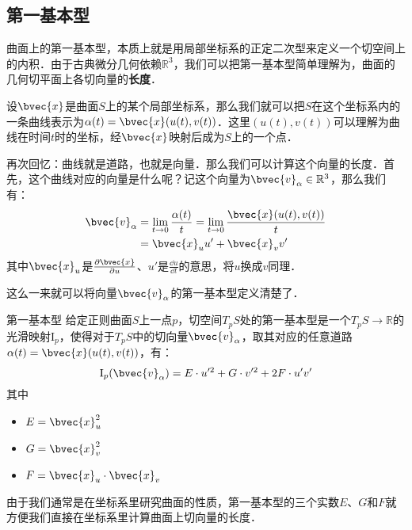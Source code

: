 
\subsection{第一基本型}

曲面上的第一基本型，本质上就是用局部坐标系的正定二次型来定义一个切空间上的内积．由于古典微分几何依赖$\mathbb{R}^3$，我们可以把第一基本型简单理解为，曲面的几何切平面上各切向量的\textbf{长度}．

设$\bvec{x}$是曲面$S$上的某个局部坐标系，那么我们就可以把$S$在这个坐标系内的一条曲线表示为$\alpha(t)=\bvec{x}(u(t), v(t))$．这里$(u(t), v(t))$可以理解为曲线在时间$t$时的坐标，经$\bvec{x}$映射后成为$S$上的一个点．

再次回忆：曲线就是道路，也就是向量．那么我们可以计算这个向量的长度．首先，这个曲线对应的向量是什么呢？记这个向量为$\bvec{v}_\alpha\in\mathbb{R}^3$，那么我们有：
\begin{equation}
\begin{aligned}
\bvec{v}_\alpha&=\lim\limits_{t\to 0}\frac{\alpha(t)}{t}=\lim\limits_{t\to 0}\frac{\bvec{x}(u(t), v(t))}{t}\\
&=\bvec{x}_uu'+\bvec{x}_vv'
\end{aligned}
\end{equation}
其中$\bvec{x}_u$是$\frac{\partial\bvec{x}}{\partial u}$、$u'$是$\frac{\dd u}{\dd t}$的意思，将$u$换成$v$同理．

这么一来就可以将向量$\bvec{v}_\alpha$的第一基本型定义清楚了．

\begin{definition}{第一基本型}\label{FForm_def1}
给定正则曲面$S$上一点$p$，切空间$T_pS$处的第一基本型是一个$T_pS\to \mathbb{R}$的光滑映射$\mathrm{I}_p$，使得对于$T_pS$中的切向量$\bvec{v}_\alpha$，取其对应的任意道路$\alpha(t)=\bvec{x}(u(t), v(t))$，有：$$\mathrm{I}_p(\bvec{v}_\alpha)=E\cdot u'^2+G\cdot v'^2+ 2F\cdot u'v'$$
其中
\begin{itemize}
\item $E=\bvec{x}_u^2$
\item $G=\bvec{x}_v^2$
\item $F=\bvec{x}_u\cdot\bvec{x}_v$
\end{itemize}
\end{definition}

由于我们通常是在坐标系里研究曲面的性质，第一基本型的三个实数$E$、$G$和$F$就方便我们直接在坐标系里计算曲面上切向量的长度．

